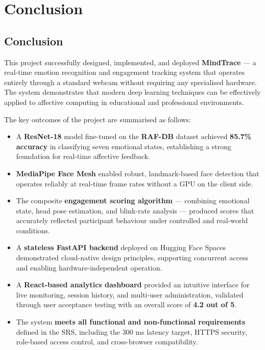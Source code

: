 \chapter{Conclusion}

\section{Conclusion}

This project successfully designed, implemented, and deployed \textbf{MindTrace}
— a real-time emotion recognition and engagement tracking system that operates
entirely through a standard webcam without requiring any specialised hardware.
The system demonstrates that modern deep learning techniques can be effectively
applied to affective computing in educational and professional environments.

The key outcomes of the project are summarised as follows:

\begin{itemize}
    \item A \textbf{ResNet-18} model fine-tuned on the \textbf{RAF-DB} dataset
          achieved \textbf{85.7\% accuracy} in classifying seven emotional
          states, establishing a strong foundation for real-time affective
          feedback.

    \item \textbf{MediaPipe Face Mesh} enabled robust, landmark-based face
          detection that operates reliably at real-time frame rates without
          a GPU on the client side.

    \item The composite \textbf{engagement scoring algorithm} — combining
          emotional state, head pose estimation, and blink-rate analysis —
          produced scores that accurately reflected participant behaviour
          under controlled and real-world conditions.

    \item A \textbf{stateless FastAPI backend} deployed on Hugging Face Spaces
          demonstrated cloud-native design principles, supporting concurrent
          access and enabling hardware-independent operation.

    \item A \textbf{React-based analytics dashboard} provided an intuitive
          interface for live monitoring, session history, and multi-user
          administration, validated through user acceptance testing with an
          overall score of \textbf{4.2 out of 5}.

    \item The system \textbf{meets all functional and non-functional
          requirements} defined in the SRS, including the 300 ms latency
          target, HTTPS security, role-based access control, and
          cross-browser compatibility.
\end{itemize}

